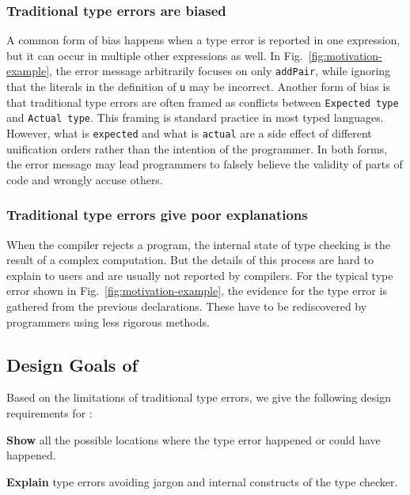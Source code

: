 \subsubsection{\textbf{Traditional type errors are biased}}
A common form of bias happens when a type error is reported in one expression, but it can occur in multiple other expressions as well. In Fig.~\ref{fig:motivation-example}, the error message arbitrarily focuses on only \texttt{addPair}, while ignoring that the literals in the definition of \texttt{u} may be incorrect. %
Another form of bias is that traditional type errors are often framed as conflicts between \texttt{Expected type} and \texttt{Actual type}. This framing is standard practice in most typed languages. However, what is \texttt{expected} and what is \texttt{actual} are a side effect of different unification orders rather than the intention of the programmer. In both forms, the error message may lead programmers to falsely believe the validity of parts of code and wrongly accuse others.

\subsubsection{\textbf{Traditional type errors give poor explanations}}
When the compiler rejects a program, the internal state of type checking is the result of a complex computation. But the details of this process are hard to explain to users and are usually not reported by compilers. For the typical type error shown in Fig.~\ref{fig:motivation-example}, the evidence for the type error is gathered from the previous declarations. These have to be rediscovered by programmers using less rigorous methods. 

\subsection{Design Goals of \chameleon{}}
Based on the limitations of traditional type errors, we give the following design requirements for \chameleon{}:

\noindent\textbf{Show} all the possible locations where the type error happened or could have happened.

\noindent\textbf{Explain} type errors avoiding jargon and internal constructs of the type checker.

